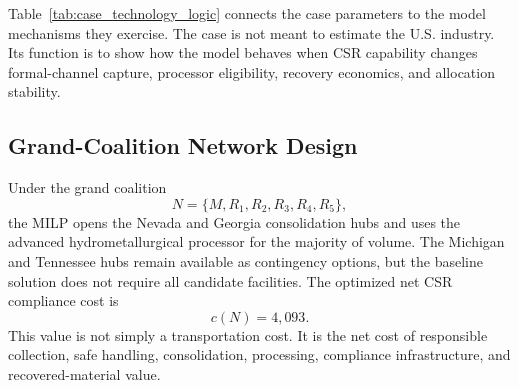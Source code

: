 \begin{table}[htbp]
\centering
\caption{Technology and Governance Logic in the Case Study}
\label{tab:case_technology_logic}
\end{table}

Table~\ref{tab:case_technology_logic} connects the case parameters to the model mechanisms they exercise. The case is not meant to estimate the U.S. industry. Its function is to show how the model behaves when CSR capability changes formal-channel capture, processor eligibility, recovery economics, and allocation stability.

\subsection{Grand-Coalition Network Design}

Under the grand coalition
\begin{equation*}
N=\{M,R_1,R_2,R_3,R_4,R_5\},
\end{equation*}
the MILP opens the Nevada and Georgia consolidation hubs and uses the advanced hydrometallurgical processor for the majority of volume. The Michigan and Tennessee hubs remain available as contingency options, but the baseline solution does not require all candidate facilities. The optimized net CSR compliance cost is
\begin{equation*}
c(N)=4{,}093.
\end{equation*}
This value is not simply a transportation cost. It is the net cost of responsible collection, safe handling, consolidation, processing, compliance infrastructure, and recovered-material value.

